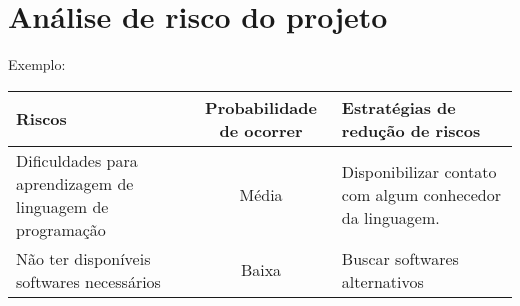 \section{Análise de risco do projeto}

\noindent {}
 
\vspace{0.5cm}

{\color{red} Exemplo: }

\begin{center}
    \begin{tabu} spread \linewidth {| X[m] | c | X[m] |}\hline
        \textbf{Riscos} & \textbf{Probabilidade de ocorrer} & \textbf{Estratégias de redução de riscos} \\      \hline
       Dificuldades para aprendizagem de linguagem de programação  & Média & \vspace{0.2cm} Disponibilizar contato com algum conhecedor da linguagem.\vspace{0.2cm} \\ \hline
       Não ter disponíveis softwares necessários  & Baixa & \vspace{0.2cm} Buscar softwares alternativos \vspace{0.2cm} \\ \hline
    \end{tabu}
\end{center}